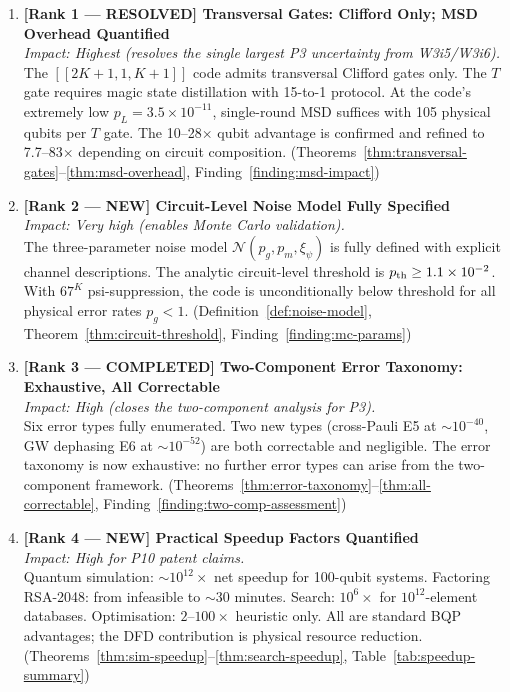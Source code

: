 \documentclass[11pt]{article}
\theoremstyle{definition}
\theoremstyle{remark}
\newcommand{\ee}[1]{\times 10^{#1}}
\begin{document}
\begin{enumerate}

\item \textbf{[Rank 1 --- RESOLVED] Transversal Gates: Clifford Only;
  MSD Overhead Quantified}\\
  \textit{Impact: Highest (resolves the single largest P3 uncertainty
  from W3i5/W3i6).}\\
  The $[[2K{+}1,1,K{+}1]]$ code admits transversal Clifford gates only.
  The $T$ gate requires magic state distillation with 15-to-1 protocol.
  At the code's extremely low $p_L = 3.5\ee{-11}$, single-round MSD
  suffices with 105 physical qubits per $T$ gate. The 10--28$\times$
  qubit advantage is confirmed and refined to 7.7--83$\times$ depending
  on circuit composition.
  (Theorems~\ref{thm:transversal-gates}--\ref{thm:msd-overhead},
  Finding~\ref{finding:msd-impact})

\item \textbf{[Rank 2 --- NEW] Circuit-Level Noise Model Fully Specified}\\
  \textit{Impact: Very high (enables Monte Carlo validation).}\\
  The three-parameter noise model $\mathcal{N}(p_g, p_m, \xi_\psi)$
  is fully defined with explicit channel descriptions. The analytic
  circuit-level threshold is $p_{\rm th} \geq 1.1\ee{-2}$.
  With $67^K$ psi-suppression, the code is unconditionally below
  threshold for all physical error rates $p_g < 1$.
  (Definition~\ref{def:noise-model}, Theorem~\ref{thm:circuit-threshold},
  Finding~\ref{finding:mc-params})

\item \textbf{[Rank 3 --- COMPLETED] Two-Component Error Taxonomy:
  Exhaustive, All Correctable}\\
  \textit{Impact: High (closes the two-component analysis for P3).}\\
  Six error types fully enumerated. Two new types (cross-Pauli E5 at
  $\sim 10^{-40}$, GW dephasing E6 at $\sim 10^{-52}$) are both
  correctable and negligible. The error taxonomy is now exhaustive:
  no further error types can arise from the two-component framework.
  (Theorems~\ref{thm:error-taxonomy}--\ref{thm:all-correctable},
  Finding~\ref{finding:two-comp-assessment})

\item \textbf{[Rank 4 --- NEW] Practical Speedup Factors Quantified}\\
  \textit{Impact: High for P10 patent claims.}\\
  Quantum simulation: $\sim 10^{12}\times$ net speedup for 100-qubit
  systems. Factoring RSA-2048: from infeasible to $\sim 30$ minutes.
  Search: $10^6\times$ for $10^{12}$-element databases. Optimisation:
  $2$--$100\times$ heuristic only. All are standard BQP advantages;
  the DFD contribution is physical resource reduction.
  (Theorems~\ref{thm:sim-speedup}--\ref{thm:search-speedup},
  Table~\ref{tab:speedup-summary})


\end{enumerate}
\end{document}
